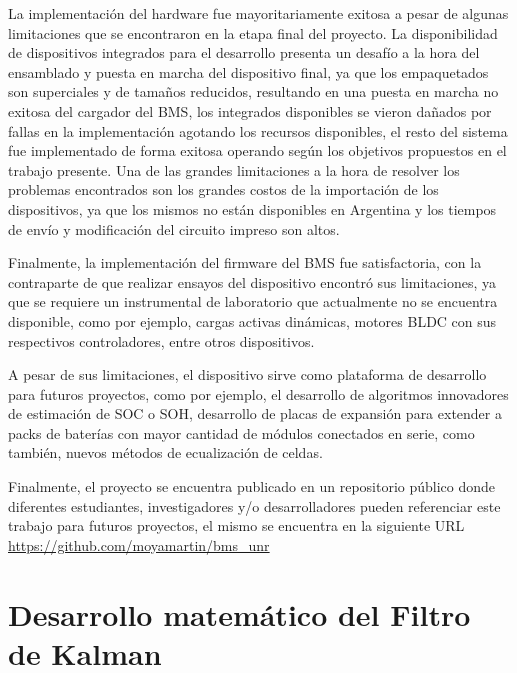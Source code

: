 \documentclass[10pt, a4paper]{report}
\begin{document}
La implementaci\'on del hardware fue mayoritariamente exitosa a pesar de algunas 
limitaciones que se encontraron en la etapa final del proyecto. La 
disponibilidad de dispositivos integrados para el desarrollo presenta un 
desaf\'io a la hora del ensamblado y puesta en marcha del dispositivo final, ya 
que los empaquetados son superciales y de tamaños reducidos, resultando en una 
puesta en marcha no exitosa del cargador del \acrshort{BMS}, los integrados 
disponibles se vieron dañados por fallas en la implementaci\'on agotando los 
recursos disponibles, el resto del sistema fue implementado de forma exitosa 
operando seg\'un los objetivos propuestos en el trabajo presente. Una de las 
grandes limitaciones a la hora de resolver los problemas encontrados son los 
grandes costos de la importaci\'on de los dispositivos, ya que los mismos no 
est\'an disponibles en Argentina y los tiempos de env\'io y modificaci\'on del 
circuito impreso son altos.

Finalmente, la implementaci\'on del firmware del \acrshort{BMS} fue
satisfactoria, con la contraparte de que realizar ensayos del dispositivo
encontr\'o sus limitaciones, ya que se requiere un instrumental de laboratorio
que actualmente no se encuentra disponible, como por ejemplo, cargas activas
din\'amicas, motores \acrshort{BLDC} con sus respectivos controladores, entre
otros dispositivos.

A pesar de sus limitaciones, el dispositivo sirve como plataforma de desarrollo
para futuros proyectos, como por ejemplo, el desarrollo de algoritmos
innovadores de estimaci\'on de \acrshort{SOC} o \acrshort{SOH}, desarrollo de
placas de expansi\'on para extender a packs de bater\'ias con mayor cantidad de
m\'odulos conectados en serie, como tambi\'en, nuevos m\'etodos de
ecualizaci\'on de celdas.

Finalmente, el proyecto se encuentra publicado en un repositorio p\'ublico donde
diferentes estudiantes, investigadores y/o desarrolladores pueden referenciar
este trabajo para futuros proyectos, el mismo se encuentra en la siguiente URL 
\href{https://github.com/moyamartin/bms_unr}{https://github.com/moyamartin/bms\_unr}

\newpage

\printbibliography[heading=bibintoc]

\newpage

\appendix 

\chapter{Desarrollo matem\'atico del Filtro de Kalman}\label{matKalman}
\thispagestyle{fancy}
\end{document}
